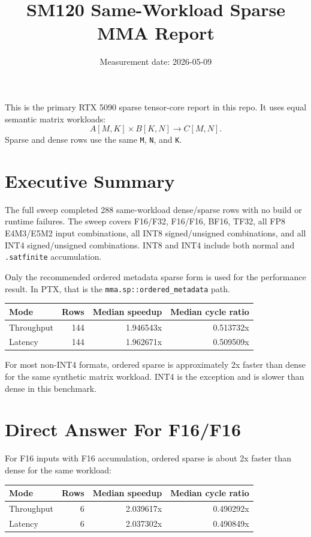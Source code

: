 \documentclass[10pt]{article}
\title{SM120 Same-Workload Sparse MMA Report}
\author{}
\date{Measurement date: 2026-05-09}
\begin{document}
\maketitle

This is the primary RTX 5090 sparse tensor-core report in this repo. It uses
equal semantic matrix workloads:
\[
A[M,K] \times B[K,N] \rightarrow C[M,N].
\]
Sparse and dense rows use the same \texttt{M}, \texttt{N}, and \texttt{K}.

\section{Executive Summary}

The full sweep completed 288 same-workload dense/sparse rows with no build or
runtime failures. The sweep covers F16/F32, F16/F16, BF16, TF32, all FP8
E4M3/E5M2 input combinations, all INT8 signed/unsigned combinations, and all
INT4 signed/unsigned combinations. INT8 and INT4 include both normal and
\texttt{.satfinite} accumulation.

Only the recommended ordered metadata sparse form is used for the performance
result. In PTX, that is the \texttt{mma.sp::ordered\_metadata} path.

\begin{center}
\small
\begin{tabular}{lrrr}
\toprule
Mode & Rows & Median speedup & Median cycle ratio \\
\midrule
Throughput & 144 & 1.946543x & 0.513732x \\
Latency & 144 & 1.962671x & 0.509509x \\
\bottomrule
\end{tabular}
\end{center}

For most non-INT4 formats, ordered sparse is approximately 2x faster than dense
for the same synthetic matrix workload. INT4 is the exception and is slower than
dense in this benchmark.

\section{Direct Answer For F16/F16}

For F16 inputs with F16 accumulation, ordered sparse is about 2x faster than
dense for the same workload:

\begin{center}
\small
\begin{tabular}{lrrr}
\toprule
Mode & Rows & Median speedup & Median cycle ratio \\
\midrule
Throughput & 6 & 2.039617x & 0.490292x \\
Latency & 6 & 2.037302x & 0.490849x \\
\bottomrule
\end{tabular}
\end{center}
\end{document}
